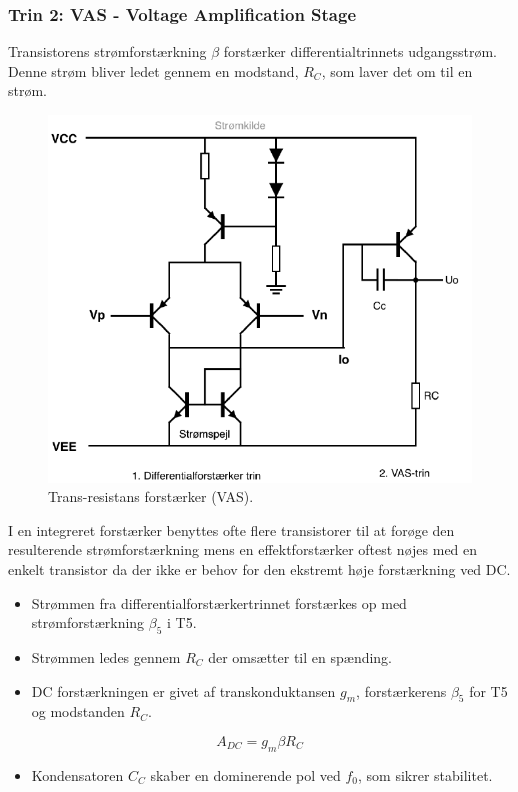 \documentclass[danish]{article}
\begin{document}
\newpage 
\subsubsection{Trin 2: VAS - Voltage Amplification Stage} 
Transistorens strømforstærkning $\beta$ forstærker differentialtrinnets udgangsstrøm. Denne strøm bliver ledet gennem en modstand, $R_C$, som laver det om til en strøm. 

\begin{figure} [H]
	\centering
	\includegraphics[width=0.7\linewidth]{graphics/vas}
	\caption{Trans-resistans forstærker (VAS).}
	\label{fig:VAS_forstarker}
\end{figure}

I en integreret forstærker benyttes ofte flere transistorer til at forøge den resulterende strømforstærkning mens en effektforstærker oftest nøjes med en enkelt transistor da der ikke er behov for den ekstremt høje forstærkning ved DC. 

\begin{itemize}
	\item Strømmen fra differentialforstærkertrinnet forstærkes op med strømforstærkning $\beta_5$ i T5.
	\item Strømmen ledes gennem $R_C$ der omsætter til en spænding.
	\item DC forstærkningen er givet af transkonduktansen $g_m$, forstærkerens $\beta_5$ for T5 og modstanden $R_C$.
\end{itemize}

\begin{equation} 
A_{DC} = g_m \beta R_C
\end{equation}

\begin{itemize}
	\item Kondensatoren $C_C$ skaber en dominerende pol ved $f_0$, som sikrer stabilitet.
\end{itemize}
\end{document}
